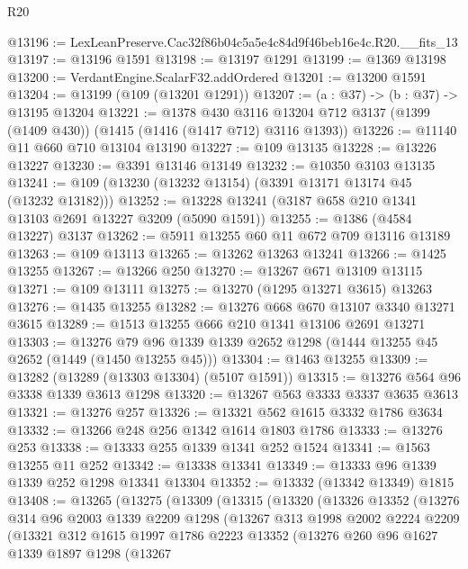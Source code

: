 \begin{lexlean}{R20}
\begin{coremodule}
@13196 := LexLeanPreserve.Cac32f86b04c5a5e4c84d9f46beb16e4c.R20.__fits_13
@13197 := @13196 @1591
@13198 := @13197 @1291
@13199 := @1369 @13198
@13200 := VerdantEngine.ScalarF32.addOrdered
@13201 := @13200 @1591
@13204 := @13199 (@109 (@13201 @1291))
@13207 := (a : @37) -> (b : @37) -> @13195 @13204
@13221 := @1378
    @430
    @3116
    @13204
    @712
    @3137
    (@1399 (@1409 @430))
    (@1415 (@1416 (@1417 @712) @3116 @1393))
@13226 := @11140 @11 @660 @710 @13104 @13190
@13227 := @109 @13135
@13228 := @13226 @13227
@13230 := @3391 @13146 @13149
@13232 := @10350 @3103 @13135
@13241 := @109 (@13230 (@13232 @13154) (@3391 @13171 @13174 @45 (@13232 @13182)))
@13252 := @13228 @13241 (@3187 @658 @210 @1341 @13103 @2691 @13227 @3209 (@5090 @1591))
@13255 := @1386 (@4584 @13227) @3137
@13262 := @5911 @13255 @60 @11 @672 @709 @13116 @13189
@13263 := @109 @13113
@13265 := @13262 @13263 @13241
@13266 := @1425 @13255
@13267 := @13266 @250
@13270 := @13267 @671 @13109 @13115
@13271 := @109 @13111
@13275 := @13270 (@1295 @13271 @3615) @13263
@13276 := @1435 @13255
@13282 := @13276 @668 @670 @13107 @3340 @13271 @3615
@13289 := @1513 @13255 @666 @210 @1341 @13106 @2691 @13271
@13303 := @13276 @79 @96 @1339 @1339 @2652 @1298 (@1444 @13255 @45 @2652 (@1449 (@1450 @13255 @45)))
@13304 := @1463 @13255
@13309 := @13282 (@13289 (@13303 @13304) (@5107 @1591))
@13315 := @13276 @564 @96 @3338 @1339 @3613 @1298
@13320 := @13267 @563 @3333 @3337 @3635 @3613
@13321 := @13276 @257
@13326 := @13321 @562 @1615 @3332 @1786 @3634
@13332 := @13266 @248 @256 @1342 @1614 @1803 @1786
@13333 := @13276 @253
@13338 := @13333 @255 @1339 @1341 @252 @1524
@13341 := @1563 @13255 @11 @252
@13342 := @13338 @13341
@13349 := @13333 @96 @1339 @1339 @252 @1298 @13341 @13304
@13352 := @13332 (@13342 @13349) @1815
@13408 := @13265
    (@13275
      (@13309
        (@13315
          (@13320
            (@13326
              @13352
              (@13276
                @314
                @96
                @2003
                @1339
                @2209
                @1298
                (@13267
                  @313
                  @1998
                  @2002
                  @2224
                  @2209
                  (@13321
                    @312
                    @1615
                    @1997
                    @1786
                    @2223
                    @13352
                    (@13276
                      @260
                      @96
                      @1627
                      @1339
                      @1897
                      @1298
                      (@13267

\end{coremodule}
\end{lexlean}
